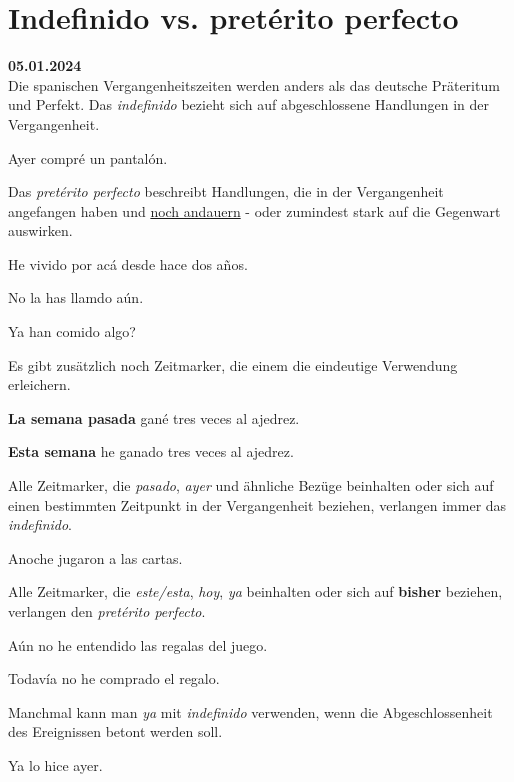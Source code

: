 \section{Indefinido vs. pret\'erito perfecto}
\textbf{05.01.2024}\\
Die spanischen Vergangenheitszeiten werden anders als das
deutsche Präteritum und Perfekt. Das \textit{indefinido}
bezieht sich auf abgeschlossene Handlungen in der Vergangenheit.
\begin{ejemplos}
    \item Ayer compr\'e un pantal\'on.
\end{ejemplos}
Das \textit{pret\'erito perfecto} beschreibt Handlungen,
die in der Vergangenheit angefangen haben und 
\underline{noch andauern} - oder zumindest stark auf die
Gegenwart auswirken.
\begin{ejemplos}
    \item He vivido por ac\'a desde hace dos a\~nos.
    \item No la has llamdo a\'un.
    \item Ya han comido algo?
\end{ejemplos}
Es gibt zusätzlich noch Zeitmarker, die einem die eindeutige
Verwendung erleichern.
\begin{ejemplos}
    \item \textbf{La semana pasada} gan\'e tres veces al ajedrez.
    \item \textbf{Esta semana} he ganado tres veces al ajedrez.
\end{ejemplos}
Alle Zeitmarker, die \textit{pasado}, \textit{ayer} und ähnliche Bezüge beinhalten
oder sich auf einen bestimmten Zeitpunkt in der Vergangenheit
beziehen, verlangen immer das \textit{indefinido}.
\begin{ejemplos}
    \item Anoche jugaron a las cartas.
\end{ejemplos}
Alle Zeitmarker, die \textit{este/esta}, \textit{hoy}, \textit{ya}
beinhalten oder sich auf \textbf{bisher} beziehen, verlangen
den \textit{pret\'erito perfecto}.
\begin{ejemplos}
    \item A\'un no he entendido las regalas del juego.
    \item Todav\'ia no he comprado el regalo.
\end{ejemplos}
Manchmal kann man \textit{ya} mit \textit{indefinido} verwenden,
wenn die Abgeschlossenheit des Ereignissen betont werden soll.
\begin{ejemplos}
    \item Ya lo hice ayer.
\end{ejemplos} 

